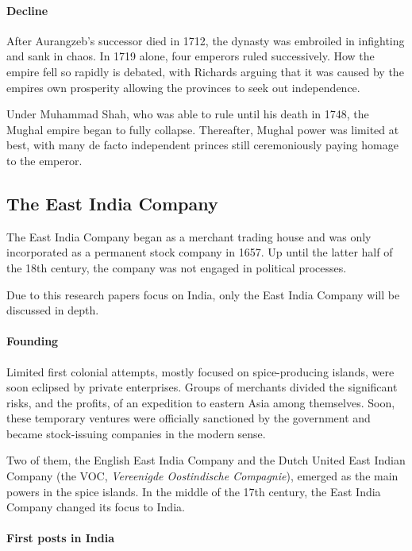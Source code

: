 \documentclass[11pt, a4paper, headings=standardclasses]{scrartcl}
\begin{document}
\paragraph{Decline}

After Aurangzeb's successor died in 1712, the dynasty was embroiled in infighting and sank in chaos. In 1719 alone, four emperors ruled successively.\autocite[Chapter 12]{richards} How the empire fell so rapidly is debated, with Richards arguing that it was caused by the empires own prosperity allowing the provinces to seek out independence.\autocite{MughalFinances}

Under Muhammad Shah, who was able to rule until his death in 1748, the Mughal empire began to fully collapse. Thereafter, Mughal power was limited at best, with many de facto independent princes still ceremoniously paying homage to the emperor.\autocite{bose}

\subsection{The East India Company}

The East India Company began as a merchant trading house and was only incorporated as a permanent stock company in 1657.\autocite{EIC2} Up until the latter half of the 18th century, the company was not engaged in political processes.

Due to this research papers focus on India, only the East India Company will be discussed in depth.

\paragraph{Founding}

Limited first colonial attempts, mostly focused on spice-producing islands, were soon eclipsed by private enterprises. Groups of merchants divided the significant risks, and the profits, of an expedition to eastern Asia among themselves. Soon, these temporary ventures were officially sanctioned by the government and became stock-issuing companies in the modern sense.

Two of them, the English East India Company and the Dutch United East Indian Company (the VOC, \textit{Vereenigde Oostindische Compagnie}), emerged as the main powers in the spice islands.\autocite{VOC} In the middle of the 17th century, the East India Company changed its focus to India.\autocite[Part I]{EIC}

\paragraph{First posts in India}
\end{document}
